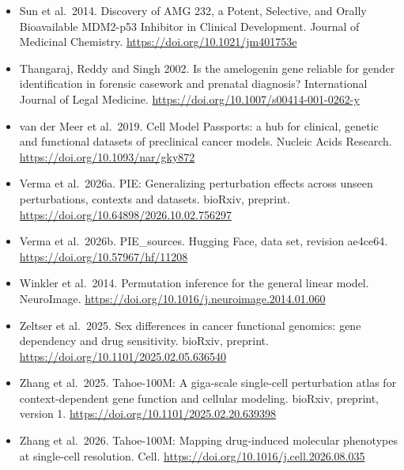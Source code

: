 \documentclass[
  11pt,
  letterpaper,
]{article}
\begin{document}
\begin{itemize}
  fluorescence-based PCR analysis of X-Y homologous gene amelogenin.
  BioTechniques, volume 15, pages 636 to 641.
  \url{https://openalex.org/W1577564952}
\item
  Sun et al.~2014. Discovery of AMG 232, a Potent, Selective, and Orally
  Bioavailable MDM2-p53 Inhibitor in Clinical Development. Journal of
  Medicinal Chemistry. \url{https://doi.org/10.1021/jm401753e}
\item
  Thangaraj, Reddy and Singh 2002. Is the amelogenin gene reliable for
  gender identification in forensic casework and prenatal diagnosis?
  International Journal of Legal Medicine.
  \url{https://doi.org/10.1007/s00414-001-0262-y}
\item
  van der Meer et al.~2019. Cell Model Passports: a hub for clinical,
  genetic and functional datasets of preclinical cancer models. Nucleic
  Acids Research. \url{https://doi.org/10.1093/nar/gky872}
\item
  Verma et al.~2026a. PIE: Generalizing perturbation effects across
  unseen perturbations, contexts and datasets. bioRxiv, preprint.
  \url{https://doi.org/10.64898/2026.10.02.756297}
\item
  Verma et al.~2026b. PIE\_sources. Hugging Face, data set, revision
  ae4ce64. \url{https://doi.org/10.57967/hf/11208}
\item
  Winkler et al.~2014. Permutation inference for the general linear
  model. NeuroImage.
  \url{https://doi.org/10.1016/j.neuroimage.2014.01.060}
\item
  Zeltser et al.~2025. Sex differences in cancer functional genomics:
  gene dependency and drug sensitivity. bioRxiv, preprint.
  \url{https://doi.org/10.1101/2025.02.05.636540}
\item
  Zhang et al.~2025. Tahoe-100M: A giga-scale single-cell perturbation
  atlas for context-dependent gene function and cellular modeling.
  bioRxiv, preprint, version 1.
  \url{https://doi.org/10.1101/2025.02.20.639398}
\item
  Zhang et al.~2026. Tahoe-100M: Mapping drug-induced molecular
  phenotypes at single-cell resolution. Cell.
  \url{https://doi.org/10.1016/j.cell.2026.08.035}
\end{itemize}
\end{document}
